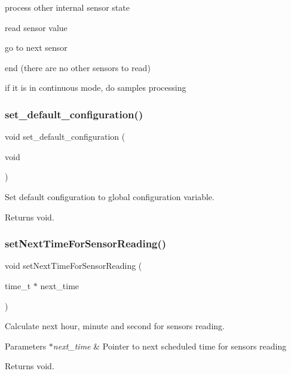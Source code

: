 process other internal sensor state

read sensor value

go to next sensor

end (there are no other sensors to read)

if it is in continuous mode, do samples processing \mbox{\label{rmap_8ino_a951e4934b8add405b8fe45417fc380f5}} 
\subsubsection{\texorpdfstring{set\+\_\+default\+\_\+configuration()}{set\_default\_configuration()}}
{\footnotesize\ttfamily void set\+\_\+default\+\_\+configuration (\begin{DoxyParamCaption}\item[{void}]{ }\end{DoxyParamCaption})}



Set default configuration to global configuration variable. 

\begin{DoxyReturn}{Returns}
void. 
\end{DoxyReturn}
\mbox{\label{rmap_8ino_a1686e2719fa4a37ef933458673973d28}} 
\subsubsection{\texorpdfstring{set\+Next\+Time\+For\+Sensor\+Reading()}{setNextTimeForSensorReading()}}
{\footnotesize\ttfamily void set\+Next\+Time\+For\+Sensor\+Reading (\begin{DoxyParamCaption}\item[{time\+\_\+t $\ast$}]{next\+\_\+time }\end{DoxyParamCaption})}



Calculate next hour, minute and second for sensors reading. 


\begin{DoxyParams}{Parameters}
{\em $\ast$next\+\_\+time} & Pointer to next scheduled time for sensors reading \\
\hline
\end{DoxyParams}
\begin{DoxyReturn}{Returns}
void. 
\end{DoxyReturn}
\mbox{\label{rmap_8ino_a21575354e8ec54fa31f581ed1838be79}} 

